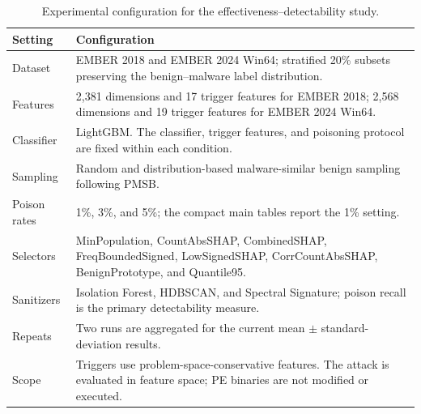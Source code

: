 \begin{table}[!t]
    \centering
    \caption{Experimental configuration for the effectiveness--detectability study.}
    \label{tab:experimental_setup}
    \setlength{\tabcolsep}{3.2pt}
    \renewcommand{\arraystretch}{1.04}
    \begin{tabularx}{\columnwidth}{>{\raggedright\arraybackslash}p{1.55cm} X}
        \toprule
        \textbf{Setting} & \textbf{Configuration} \\
        \midrule
        Dataset
            & EMBER 2018 and EMBER 2024 Win64; stratified 20\% subsets preserving the benign--malware label distribution. \\
        Features
            & 2,381 dimensions and 17 trigger features for EMBER 2018; 2,568 dimensions and 19 trigger features for EMBER 2024 Win64. \\
        Classifier
            & LightGBM. The classifier, trigger features, and poisoning protocol are fixed within each condition. \\
        Sampling
            & Random and distribution-based malware-similar benign sampling following PMSB. \\
        Poison rates
            & 1\%, 3\%, and 5\%; the compact main tables report the 1\% setting. \\
        Selectors
            & MinPopulation, CountAbsSHAP, CombinedSHAP, FreqBoundedSigned, LowSignedSHAP, CorrCountAbsSHAP, BenignPrototype, and Quantile95. \\
        Sanitizers
            & Isolation Forest, HDBSCAN, and Spectral Signature; poison recall is the primary detectability measure. \\
        Repeats
            & Two runs are aggregated for the current mean $\pm$ standard-deviation results. \\
        Scope
            & Triggers use problem-space-conservative features. The attack is evaluated in feature space; PE binaries are not modified or executed. \\
        \bottomrule
    \end{tabularx}
\end{table}
